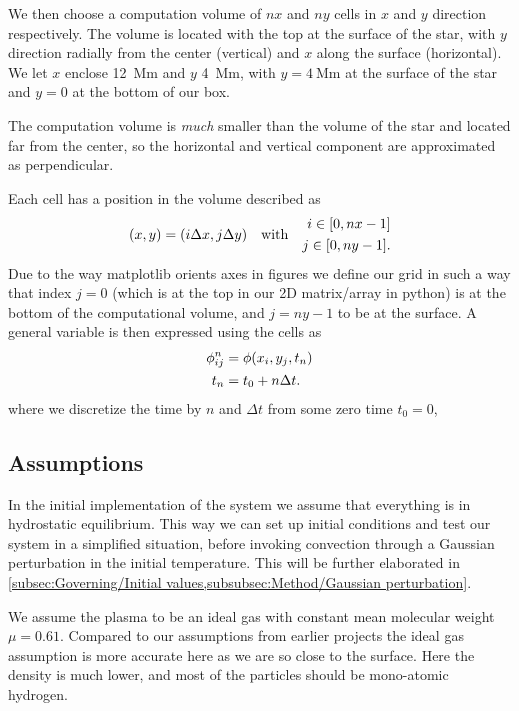 \documentclass[11pt,a4paper,twocolumn,titlepage]{article}
\begin{document}
We then choose a computation volume of $nx$ and $ny$ cells in $x$ and $y$ direction respectively. The volume is located with the top at the surface of the star, with $y$ direction radially from the center (vertical) and $x$ along the surface (horizontal). We let $x$ enclose \SI{12}{\mega \m} and $y$ \SI{4}{\mega \m}, with $y=\SI{4}{\mega \m}$ at the surface of the star and $y=0$ at the bottom of our box.

The computation volume is \textit{much} smaller than the volume of the star and located far from the center, so the horizontal and vertical component are approximated as perpendicular.

Each cell has a position in the volume described as 
\begin{equation*}
(x,y) = \qty(i\Delta x, j\Delta y) \qq{with}
\begin{aligned}
i \in [0,nx-1]
\\
j \in [0,ny-1].
\end{aligned}
\end{equation*}
Due to the way matplotlib orients axes in figures we define our grid in such a way that index $j=0$ (which is at the top in our 2D matrix/array in python) is at the bottom of the computational volume, and $j=ny-1$ to be at the surface. A general variable is then expressed using the cells as 
\begin{align*}
\phi_{ij}^n &= \phi\qty(x_i,y_j,t_n)
\\
t_n &= t_0 + n \Delta t.
\end{align*}
where we discretize the time by $n$ and $\Delta t$ from some zero time $t_0=0$,

\subsection{Assumptions}\label{subsec:Intro/Assumptions}
In the initial implementation of the system we assume that everything is in hydrostatic equilibrium. This way we can set up initial conditions and test our system in a simplified situation, before invoking convection through a Gaussian perturbation in the initial temperature. This will be further elaborated in \cref{subsec:Governing/Initial values,subsubsec:Method/Gaussian perturbation}.

We assume the plasma to be an ideal gas with constant mean molecular weight $\mu = 0.61$. Compared to our assumptions from earlier projects the ideal gas assumption is more accurate here as we are so close to the surface. Here the density is much lower, and most of the particles should be mono-atomic hydrogen.
\end{document}
